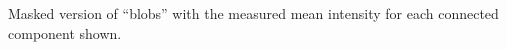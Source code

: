 \label{fig:blobs_mean_intensity} Masked version of ``blobs'' with the measured mean intensity for each connected component shown.